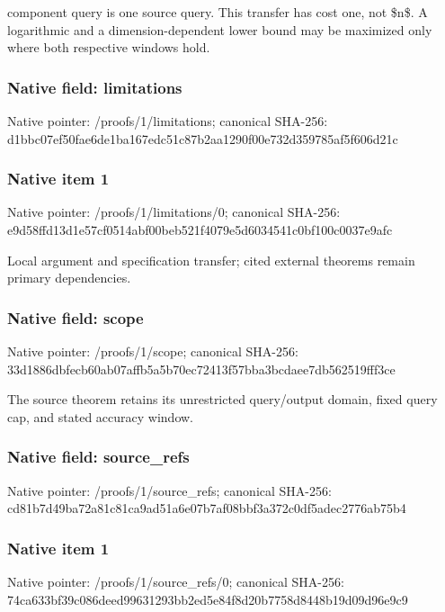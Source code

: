 \documentclass[10pt,a4paper]{article}
\begin{document}
component query is one source query. This transfer has cost one,\allowbreak{} not \$n\$. A logarithmic and a dimension-dependent lower bound may be maximized only where both respective windows hold.\par\endgroup

\subsubsection{Native field: limitations}
Native pointer: /proofs/1/limitations; canonical SHA-256: d1bbc07ef50fae6de1ba167edc51c87b2aa1290f00e732d359785af5f606d21c

\subsubsection{Native item 1}
Native pointer: /proofs/1/limitations/0; canonical SHA-256: e9d58ffd13d1e57cf0514abf00beb521f4079e5d6034541c0bf100c0037e9afc

\begingroup\raggedright\sloppy Local argument and specification transfer;\allowbreak{} cited external theorems remain primary dependencies.\par\endgroup

\subsubsection{Native field: scope}
Native pointer: /proofs/1/scope; canonical SHA-256: 33d1886dbfecb60ab07affb5a5b70ec72413f57bba3bcdaee7db562519fff3ce

\begingroup\raggedright\sloppy The source theorem retains its unrestricted query/\allowbreak{}output domain,\allowbreak{} fixed query cap,\allowbreak{} and stated accuracy window.\par\endgroup

\subsubsection{Native field: source\_\allowbreak{}refs}
Native pointer: /proofs/1/source\_\allowbreak{}refs; canonical SHA-256: cd81b7d49ba72a81c81ca9ad51a6e07b7af08bbf3a372c0df5adec2776ab75b4

\subsubsection{Native item 1}
Native pointer: /proofs/1/source\_\allowbreak{}refs/0; canonical SHA-256: 74ca633bf39c086deed99631293bb2ed5e84f8d20b7758d8448b19d09d96e9c9
\end{document}
